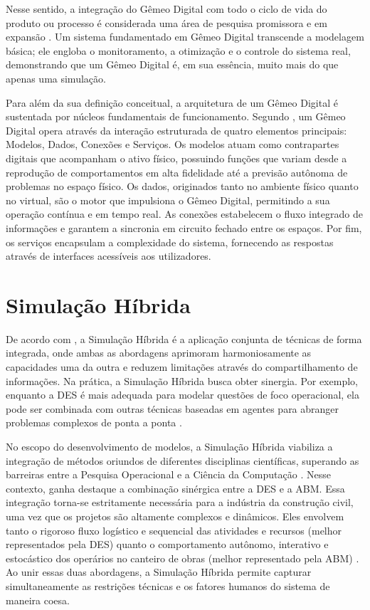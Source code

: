 Nesse sentido, a integração do Gêmeo Digital com todo o ciclo de vida do produto ou processo é considerada uma área de pesquisa promissora e em expansão \cite{sapandanylogic}. Um sistema fundamentado em Gêmeo Digital transcende a modelagem básica; ele engloba o monitoramento, a otimização e o controle do sistema real, demonstrando que um Gêmeo Digital é, em sua essência, muito mais do que apenas uma simulação.

Para além da sua definição conceitual, a arquitetura de um Gêmeo Digital é sustentada por núcleos fundamentais de funcionamento. Segundo , um Gêmeo Digital opera através da interação estruturada de quatro elementos principais: Modelos, Dados, Conexões e Serviços. Os modelos atuam como contrapartes digitais que acompanham o ativo físico, possuindo funções que variam desde a reprodução de comportamentos em alta fidelidade até a previsão autônoma de problemas no espaço físico. Os dados, originados tanto no ambiente físico quanto no virtual, são o motor que impulsiona o Gêmeo Digital, permitindo a sua operação contínua e em tempo real. As conexões estabelecem o fluxo integrado de informações e garantem a sincronia em circuito fechado entre os espaços. Por fim, os serviços encapsulam a complexidade do sistema, fornecendo as respostas através de interfaces acessíveis aos utilizadores.




\section{Simulação Híbrida}
\label{sec:hibsim}

De acordo com , a Simulação Híbrida  é a aplicação conjunta de técnicas de forma integrada, onde ambas as abordagens aprimoram harmoniosamente as capacidades uma da outra e reduzem limitações através do compartilhamento de informações. Na prática, a Simulação Híbrida busca obter sinergia. Por exemplo, enquanto a DES é mais adequada para modelar questões de foco operacional, ela pode ser combinada com outras técnicas baseadas em agentes para abranger problemas complexos de ponta a ponta \cite{fakhimi2023}.

No escopo do desenvolvimento de modelos, a Simulação Híbrida viabiliza a integração de métodos oriundos de diferentes disciplinas científicas, superando as barreiras entre a Pesquisa Operacional e a Ciência da Computação \cite{mustafee2015}. Nesse contexto, ganha destaque a combinação sinérgica entre a DES e a ABM. Essa integração torna-se estritamente necessária para a indústria da construção civil, uma vez que os projetos são altamente complexos e dinâmicos. Eles envolvem tanto o rigoroso fluxo logístico e sequencial das atividades e recursos (melhor representados pela DES) quanto o comportamento autônomo, interativo e estocástico dos operários no canteiro de obras (melhor representado pela ABM) \cite{fakhimi2023}. Ao unir essas duas abordagens, a Simulação Híbrida permite capturar simultaneamente as restrições técnicas e os fatores humanos do sistema de maneira coesa. 

